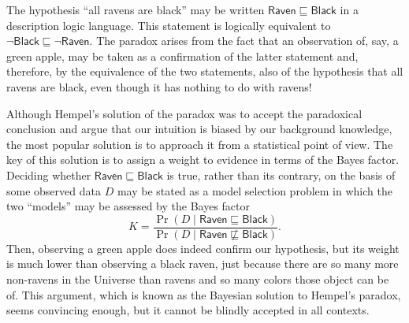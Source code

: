 \documentclass[a4paper]{article}
\newcounter{ex}
\begin{document}
The hypothesis ``all ravens are black'' may be
written $\mathsf{Raven} \sqsubseteq \mathsf{Black}$ in a description logic language.
This statement is logically equivalent to $\neg\mathsf{Black} \sqsubseteq \neg\mathsf{Raven}$.
The paradox arises from the fact that an observation of, say, a green apple,
may be taken as a confirmation of the latter statement and, therefore, by the
equivalence of the two statements, also of the hypothesis that all ravens are black,
even though it has nothing to do with ravens!

Although Hempel's solution of the paradox was to accept the paradoxical conclusion
and argue that our intuition is biased by our background knowledge, the most popular
solution is to approach it from a statistical point of view. The key of this solution
is to assign a weight to evidence in terms of the Bayes factor. Deciding whether
$\mathsf{Raven} \sqsubseteq \mathsf{Black}$ is true, rather than its contrary, on the basis
of some observed data $D$ may be stated as a model selection problem in which the two
``models'' may be assessed by the Bayes factor
\begin{equation}
  K = \frac{\Pr(D \mid \mathsf{Raven} \sqsubseteq \mathsf{Black})}{\Pr(D \mid \mathsf{Raven} \not\sqsubseteq \mathsf{Black})}.
\end{equation}
Then, observing a green apple does indeed confirm our hypothesis, but its weight
is much lower than observing a black raven, just because there are so many more non-ravens in the
Universe than ravens and so many colors those object can be of. This argument, which
is known as the Bayesian solution to Hempel's paradox, seems convincing enough,
but it cannot be blindly accepted in all contexts.
\end{document}
